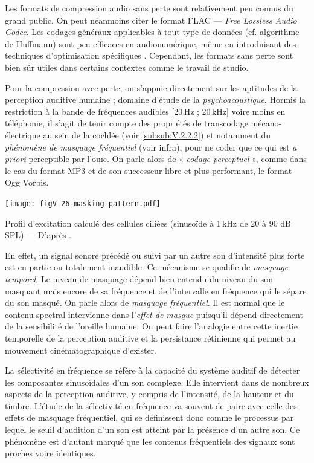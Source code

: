 Les formats de compression audio sans perte sont relativement peu connus du grand public. On peut néanmoins citer le format FLAC --- \textit{Free Lossless Audio Codec}. Les codages généraux applicables à tout type de données (cf. \href{https://fr.wikipedia.org/wiki/Codage_de_Huffman}{algorithme de Huffmann}) sont peu efficaces en audionumérique, même en introduisant des techniques d'optimisation spécifiques \parencite{Roads:2007}. Cependant, les formats sans perte sont bien sûr utiles dans certains contextes comme le travail de studio.

Pour la compression avec perte, on s'appuie directement sur les aptitudes de la perception auditive humaine ; domaine d'étude de la \emph{psychoacoustique}. Hormis la restriction à la bande de fréquences audibles [20\,Hz ; 20\,kHz] voire moins en téléphonie, il s'agit de tenir compte des propriétés de transcodage mécano-électrique au sein de la cochlée (voir \cref{subsub:V.2.2.2}) et notamment du \emph{phénomène de masquage fréquentiel} (voir infra), pour ne coder que ce qui est \textit{a priori} perceptible par l’ouïe. On parle alors de « \emph{codage perceptuel} », comme dans le cas du format MP3 et de son successeur libre et plus performant, le format Ogg Vorbis.

\begin{marginfigure}
\texttt{[image: figV-26-masking-pattern.pdf]}
\caption{\label{fig:V.26}Profil d'excitation calculé des cellules ciliées (sinusoïde à 1\,kHz de 20 à 90 dB SPL) --- D'après \parencite{Rossing-etal:2002}.}
\end{marginfigure}

En effet, un signal sonore précédé ou suivi par un autre son d'intensité plus forte est en partie ou totalement inaudible. Ce mécanisme se qualifie de \emph{masquage temporel}. Le niveau de masquage dépend bien entendu du niveau du son masquant mais encore de sa fréquence et de l'intervalle en fréquence qui le sépare du son masqué. On parle alors de \emph{masquage fréquentiel}. Il est normal que le contenu spectral intervienne dans l'\emph{effet de masque} puisqu'il dépend directement de la sensibilité de l'oreille humaine. On peut faire l'analogie entre cette inertie temporelle de la perception auditive et la persistance rétinienne qui permet au mouvement cinématographique d'exister.

La sélectivité en fréquence se réfère à la capacité du système auditif de détecter les composantes sinusoïdales d'un son complexe. Elle intervient dans de nombreux aspects de la perception auditive, y compris de l'intensité, de la hauteur et du timbre. L'étude de la sélectivité en fréquence va souvent de paire avec celle des effets de masquage fréquentiel, qui se définissent donc comme le processus par lequel le seuil d'audition d'un son est atteint par la présence d'un autre son. Ce phénomène est d'autant marqué que les contenus fréquentiels des signaux sont proches voire identiques.

